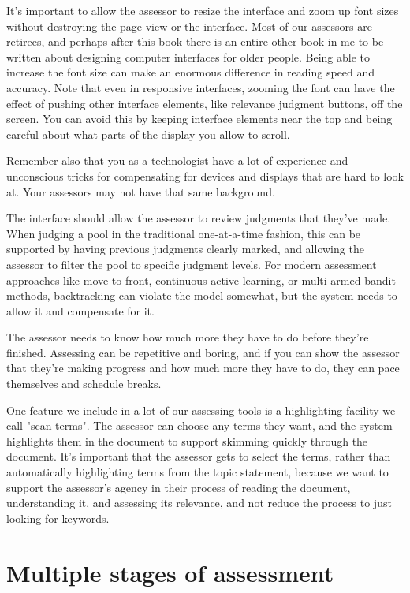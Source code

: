 \documentclass[nobib]{tufte-book}
\begin{document}
It's important to allow the assessor to resize the interface and zoom up font sizes without destroying the page view or the interface.  Most of our assessors are retirees, and perhaps after this book there is an entire other book in me to be written about designing computer interfaces for older people.  Being able to increase the font size can make an enormous difference in reading speed and accuracy.  Note that even in responsive interfaces, zooming the font can have the effect of pushing other interface elements, like relevance judgment buttons, off the screen.  You can avoid this by keeping interface elements near the top and being careful about what parts of the display you allow to scroll.

Remember also that you as a technologist have a lot of experience and unconscious tricks for compensating for devices and displays that are hard to look at.  Your assessors may not have that same background.

The interface should allow the assessor to review judgments that they've made. When judging a pool in the traditional one-at-a-time fashion, this can be supported by having previous judgments clearly marked, and allowing the assessor to filter the pool to specific judgment levels.  For modern assessment approaches like move-to-front, continuous active learning, or multi-armed bandit methods, backtracking can violate the model somewhat, but the system needs to allow it and compensate for it.

The assessor needs to know how much more they have to do before they're finished.  Assessing can be repetitive and boring, and if you can show the assessor that they're making progress and how much more they have to do, they can pace themselves and schedule breaks.

One feature we include in a lot of our assessing tools is a highlighting facility we call "scan terms".  The assessor can choose any terms they want, and the system highlights them in the document to support skimming quickly through the document.  It's important that the assessor gets to select the terms, rather than automatically highlighting terms from the topic statement, because we want to support the assessor's agency in their process of reading the document, understanding it, and assessing its relevance, and not reduce the process to just looking for keywords.

\section{Multiple stages of assessment}
\end{document}
